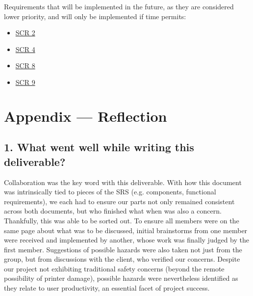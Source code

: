 \documentclass{article}
\begin{document}
Requirements that will be implemented in the future, as they are considered lower priority, and will only be implemented if time permits:
\begin{itemize}
    \item \hyperlink{scr2}{SCR 2}
    \item \hyperlink{scr4}{SCR 4}
    \item \hyperlink{scr8}{SCR 8}
    \item \hyperlink{scr9}{SCR 9}
\end{itemize}

\newpage{}

\section*{Appendix --- Reflection}

\subsection*{1. What went well while writing this deliverable?} 
Collaboration was the key word with this deliverable. With how this document was intrinsically tied 
to pieces of the SRS (e.g. components, functional requirements), we each had to ensure our parts not only 
remained consistent across both documents, but who finished what when was also a concern. Thankfully, 
this was able to be sorted out. To ensure all members were on the same page about what was to be discussed, 
initial brainstorms from one member were received and implemented by another, whose work was finally 
judged by the first member. Suggestions of possible hazards were also taken not just from the group, but 
from discussions with the client, who verified our concerns. Despite our project not exhibiting traditional 
safety concerns (beyond the remote possibility of printer damage), possible hazards were nevertheless 
identified as they relate to user productivity, an essential facet of project success.
\end{document}
